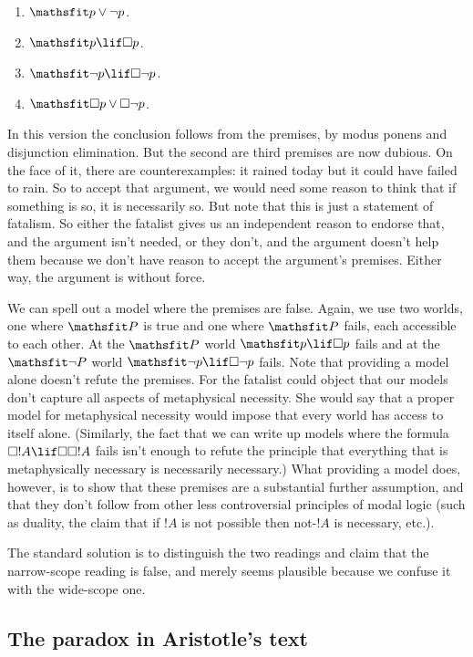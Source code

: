 \documentclass[../../../include/open-logic-section]{subfiles}
\begin{document}
\begin{enumerate}
	\item $\Obj{p \lor \lnot p}$.
	\item $\Obj{p \lif \Box p}$.
	\item $\Obj{\lnot p \lif \Box \lnot p}$.
	\item $\Obj{\Box p \lor \Box \lnot p}$.
\end{enumerate}

In this version the conclusion follows from the premises, by modus ponens and disjunction elimination. But the second are third premises are now dubious. On the face of it, there are counterexamples: it rained today but it could have failed to rain. So to accept that argument, we would need some reason to think that if something is so, it is necessarily so. But note that this is just a statement of fatalism. So either the fatalist gives us an independent reason to endorse that, and the argument isn't needed, or they don't, and the argument doesn't help them because we don't have reason to accept the argument's premises. Either way, the argument is without force.

We can spell out a model where the premises are false. Again, we use two worlds, one where $\Obj P$ is true and one where $\Obj P$ fails, each accessible to each other. At the $\Obj P$ world $\Obj {p \lif \Box p}$ fails and at the $\Obj{\lnot P}$ world $\Obj{\lnot p \lif \Box \lnot p}$ fails. Note that providing a model alone doesn't refute the premises. For the fatalist could object that our models don't capture all aspects of metaphysical necessity. She would say that a proper model for metaphysical necessity would impose that every world has access to itself alone. (Similarly, the fact that we can write up models where the formula $\Box !A \lif \Box \Box !A$ fails isn't enough to refute the principle that everything that is metaphysically necessary is necessarily necessary.) What providing a model does, however, is to show that these premises are a substantial further assumption, and that they don't follow from other less controversial principles of modal logic (such as duality, the claim that if $!A$ is not possible then not-$!A$ is necessary, etc.). 

The standard solution is to distinguish the two readings and claim that the narrow-scope reading is false, and merely seems plausible because we confuse it with the wide-scope one. 

\subsection{The paradox in Aristotle's text}
\end{document}
